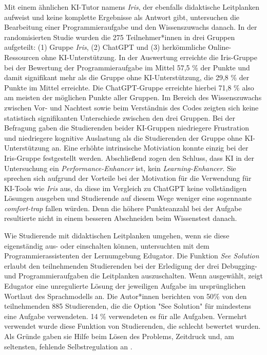 Mit einem ähnlichen KI-Tutor namens \textit{Iris}, der ebenfalls didaktische Leitplanken aufweist und keine komplette Ergebnisse als Antwort gibt, untersuchen \textcite[S. ~1]{bassner_less_2026} die Bearbeitung einer Programmieraufgabe und den Wissenszuwachs danach. In der randomisierten Studie wurden die 275 Teilnehmer*innen in drei Gruppen aufgeteilt: (1) Gruppe \textit{Iris}, (2) ChatGPT und (3) herkömmliche Online-Ressourcen ohne KI-Unterstützung. In der Auswertung erreichte die Iris-Gruppe bei der Bewertung der Programmieraufgabe im Mittel 57,5 \% der Punkte und damit signifikant mehr als die Gruppe ohne KI-Unterstützung, die 29,8 \% der Punkte im Mittel erreichte. Die ChatGPT-Gruppe erreichte hierbei 71,8 \% also am meisten der möglichen Punkte aller Gruppen. Im Bereich des Wissenszuwachs zwischen Vor- und Nachtest sowie beim Verständnis des Codes zeigten sich keine statistisch signifikanten Unterschiede zwischen den drei Gruppen. Bei der Befragung gaben die Studierenden beider KI-Gruppen niedriegere Frustration und niedriegere kognitive Auslastung als die Studierenden der Gruppe ohne KI-Unterstützung an. Eine erhöhte intrinsische Motiviation konnte einzig bei der Iris-Gruppe festgestellt werden. Abschließend zogen \textcite[S.~15]{bassner_less_2026} den Schluss, dass KI in der Untersuchung ein \textit{Performance-Enhancer} ist, kein \textit{Learning-Enhancer}. Sie sprechen sich aufgrund der Vorteile bei der Motivation für die Verwendung für KI-Tools wie \textit{Iris} aus, da diese im Vergleich zu ChatGPT keine vollständigen Lösungen ausgeben und Studierende auf diesem Wege weniger eine sogennante \textit{comfort-trap} fallen würden. Denn die höhere Punkteanzahl bei der Aufgabe resultierte nicht in einem besseren Abschneiden beim Wissenstest danach.

Wie Studierende mit didaktischen Leitplanken umgehen, wenn sie diese eigenständig aus- oder einschalten können, untersuchten \textcite[S.~1]{kapoor_exploring_2026} mit dem Programmierassistenten der Lernumgebung Edugator. Die Funktion \textit{See Solution} erlaubt den teilnehmenden Studierenden bei der Erledigung der drei Debugging- und Programmieraufgaben die Leitplanken auszuschalten. Wenn ausgewählt, zeigt Edugator eine unregulierte Lösung der jeweiligen Aufgabe im ursprünglichen Wortlaut des Sprachmodells an. Die Autor*innen berichten von 50\% von den teilnehmenden 885 Studierenden, die die Option "See Solution" für mindestens eine Aufgabe verwendeten. 14 \% verwendeten es für alle Aufgaben. Vermehrt verwendet wurde diese Funktion von Studierenden, die schlecht bewertet wurden. Als Gründe gaben sie Hilfe beim Lösen des Problems, Zeitdruck und, am seltensten, fehlende Selbstregulation an \parencite[S.~ 29]{kapoor_exploring_2026}. 


